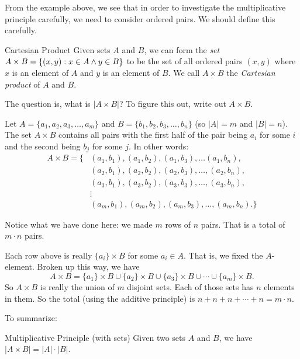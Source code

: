 \documentclass[12pt]{article}
\begin{document}
From the example above, we see that in order to investigate the multiplicative principle carefully, we need to consider ordered pairs.  We should define this carefully.

\begin{defbox}{Cartesian Product}
 Given sets $A$ and $B$, we can form the \emph{set} $A \times B = \{(x,y) : x \in A \wedge y \in B\}$ to be the set of all ordered pairs $(x,y)$ where $x$ is an element of $A$ and $y$ is an element of $B$.  We call $A \times B$ the \emph{Cartesian product} of $A$ and $B$.
\end{defbox}

The question is, what is $|A \times B|$?  To figure this out, write out $A \times B$.

Let $A = \{a_1,a_2, a_3, \ldots, a_m\}$ and $B = \{b_1,b_2, b_3, \ldots, b_n\}$  (so $|A| = m$ and $|B| = n$).  The set $A \times B$ contains all pairs with the first half of the pair being $a_i$ for some $i$ and the second being $b_j$ for some $j$.  In other words:
\begin{align*}
 A \times B = \{ & (a_1, b_1), (a_1, b_2), (a_1, b_3), \ldots (a_1, b_n), \\
  & (a_2, b_1), (a_2, b_2), (a_2, b_3), \ldots, (a_2, b_n), \\
  & (a_3, b_1), (a_3, b_2), (a_3, b_3), \ldots, (a_3, b_n), \\
  & \vdots \\
  & (a_m, b_1), (a_m, b_2), (a_m, b_3), \ldots, (a_m, b_n).\}
\end{align*}

Notice what we have done here: we made $m$ rows of $n$ pairs.  That is a total of $m \cdot n$ pairs.  

Each row above is really $\{a_i\} \times B$ for some $a_i \in A$.  That is, we fixed the $A$-element.  Broken up this way, we have
\[A \times B = \{a_1\} \times B \cup \{a_2\} \times B \cup \{a_3\}\times B \cup \cdots \cup \{a_m\} \times B.\]
So $A \times B$ is really the union of $m$ disjoint sets.  Each of those sets has $n$ elements in them.  So the total (using the additive principle) is $n + n + n + \cdots + n = m \cdot n$.

To summarize:

\begin{defbox}{Multiplicative Principle (with sets)}
 Given two sets $A$ and $B$, we have $|A \times B| = |A| \cdot |B|$.
\end{defbox}
\end{document}
